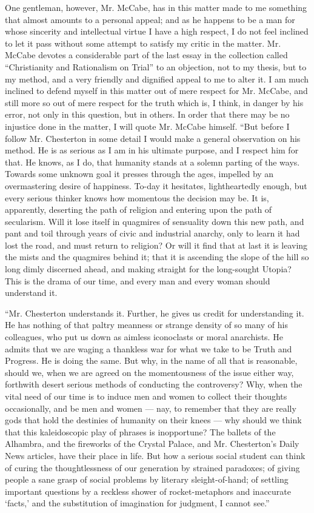 One gentleman, however, Mr. McCabe, has in this matter made to me something that almost amounts to a personal appeal; and as he happens to be a man for whose sincerity and intellectual virtue I have a high respect, I do not feel inclined to let it pass without some attempt to satisfy my critic in the matter. Mr. McCabe devotes a considerable part of the last essay in the collection called “Christianity and Rationalism on Trial” to an objection, not to my thesis, but to my method, and a very friendly and dignified appeal to me to alter it. I am much inclined to defend myself in this matter out of mere respect for Mr. McCabe, and still more so out of mere respect for the truth which is, I think, in danger by his error, not only in this question, but in others. In order that there may be no injustice done in the matter, I will quote Mr. McCabe himself. “But before I follow Mr. Chesterton in some detail I would make a general observation on his method. He is as serious as I am in his ultimate purpose, and I respect him for that. He knows, as I do, that humanity stands at a solemn parting of the ways. Towards some unknown goal it presses through the ages, impelled by an overmastering desire of happiness. To-day it hesitates, lightheartedly enough, but every serious thinker knows how momentous the decision may be. It is, apparently, deserting the path of religion and entering upon the path of secularism. Will it lose itself in quagmires of sensuality down this new path, and pant and toil through years of civic and industrial anarchy, only to learn it had lost the road, and must return to religion? Or will it find that at last it is leaving the mists and the quagmires behind it; that it is ascending the slope of the hill so long dimly discerned ahead, and making straight for the long-sought Utopia? This is the drama of our time, and every man and every woman should understand it.

“Mr. Chesterton understands it. Further, he gives us credit for understanding it. He has nothing of that paltry meanness or strange density of so many of his colleagues, who put us down as aimless iconoclasts or moral anarchists. He admits that we are waging a thankless war for what we take to be Truth and Progress. He is doing the same. But why, in the name of all that is reasonable, should we, when we are agreed on the momentousness of the issue either way, forthwith desert serious methods of conducting the controversy? Why, when the vital need of our time is to induce men and women to collect their thoughts occasionally, and be men and women — nay, to remember that they are really gods that hold the destinies of humanity on their knees — why should we think that this kaleidoscopic play of phrases is inopportune? The ballets of the Alhambra, and the fireworks of the Crystal Palace, and Mr. Chesterton’s Daily News articles, have their place in life. But how a serious social student can think of curing the thoughtlessness of our generation by strained paradoxes; of giving people a sane grasp of social problems by literary sleight-of-hand; of settling important questions by a reckless shower of rocket-metaphors and inaccurate `facts,’ and the substitution of imagination for judgment, I cannot see.”

